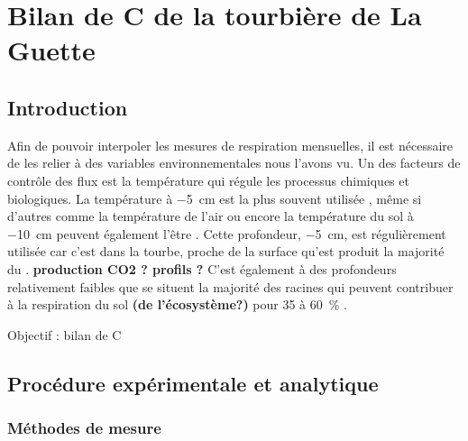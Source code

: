 \chapter{Bilan de C de la tourbière de La Guette}

\minitoc

\newpage

\section{Introduction}

Afin de pouvoir interpoler les mesures de respiration mensuelles, il est nécessaire de les relier à des variables environnementales nous l'avons vu.
Un des facteurs de contrôle des flux est la température qui régule les processus chimiques et biologiques.
La température à \SI{-5}{\cm} est la plus souvent utilisée \cite{ballantyne2014}, même si d'autres comme la température de l'air ou encore la température du sol à \SI{-10}{\cm} peuvent également l'être \cite{bortoluzzi2006,kim1992}.
Cette profondeur, \SI{-5}{\cm}, est régulièrement utilisée car c'est dans la tourbe, proche de la surface qu'est produit la majorité du \coo.
\textbf{production CO2 ? profils ?}
C'est également à des profondeurs relativement faibles que se situent la majorité des racines \plop qui peuvent contribuer à la respiration du sol \textbf{(de l'écosystème?)} pour 35 à \SI{60}{\percent} \cite{silvola1996,crow2005}.

Objectif : bilan de C


\section{Procédure expérimentale et analytique}

\subsection{Méthodes de mesure}

